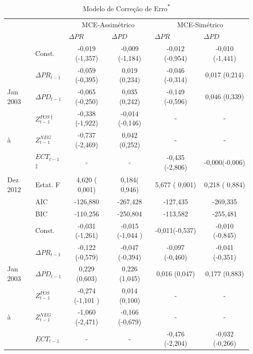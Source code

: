 \documentclass[
	article,			%
	12pt,				%
	openright,			%
	oneside,			%
	a4paper,			%
	english,			%
	brazil				%
	]{abntex2}
\begin{document}
\begin{table}[htbp]
  \centering
  \caption{Modelo de Correção de Erro\textsuperscript{$\ast$}}
    \begin{tabularx}{\textwidth}{X||l|c|c|c|c}
     \toprule
       		   &       & \multicolumn{2}{c}{MCE-Assimétrico} & \multicolumn{2}{c}{MCE-Simétrico} \\ 
       	     &  & \multicolumn{1}{l}{$\Delta PR$} & \multicolumn{1}{l}{$\Delta PD$} & \multicolumn{1}{l}{$\Delta PR$} & \multicolumn{1}{l}{$\Delta PD$} \\ \hline
    	 	  & Const.		 &  -0,019 (-1,357)  & -0,009 (-1,184)  & -0,012 (-0,954)	& -0,010 (-1,441) \\
         	 & $\Delta PR_{t-1}$   &-0,059 (-0,395)   & 0,019 (0,234)      &  -0,046 (-0,314)     & 0,017 (0,214) \\
Jan 2003   & $\Delta PD_{t-1}$    & -0,065 (-0,250)   & 0,035 (0,242)     &  -0,149 (-0,596)     & 0,046 (0,339)  \\
      	 & $Z^{POS}_{t-1}$\textsuperscript{$\dagger$}   &  -0,338 (-1,922)  &  -0,014 (-0,146) & 		-	     	&  -    		  \\
	à	& $Z^{NEG}_{t-1}$    &  -0,737 (-2,469)  &  0,042 (0,252)   &       	-		&  -	    		\\
         	& $ECT_{t-1}$\textsuperscript{$\ddagger$}   	& 		-	    & 		-		&   -0,435 (-2,806)	& -0,000(-0,006)  \\
Dez 2012	  & Estat. F 		& 4,620 ( 0,001)    &  0,184( 0,946)  &  5,677 ( 0,001)	& 0,218 ( 0,884) \\
         	 & AIC   			& -126,880	    & -267,428	       &  -127,435			&  -269,335  \\
          	& BIC  			& -110,256	    & -250,804	       & 	-113,582	        &  -255,481  \\ \hline
           	  & Const. 			& -0,031 (-1,261)	    & -0,015 (-1,044 )	 & 	-0,011(-0,537)	& -0,010	 (-0,845) \\
          	& $\Delta PR_{t-1}$ & -0,122 (-0,579)      & -0,047 (-0,394)     &  -0,097 (-0,460)    &  -0,041 (-0,351) \\
Jan 2003 	& $\Delta PD_{t-1}$ & 0,229 (0,603)    & 0,226 (1,045)       & 0,016 (0,047)      & 0,177 (0,883)  \\
      		& $Z^{POS}_{t-1}$ &  -0,274 (-1,101 )    & 0,014 (0,100)     &   -    &  - \\
	à	  & $Z^{NEG}_{t-1}$ &  -1,060 (-2,471)     & -0,166 (-0,679) &    -   &  - \\
         	& $ECT_{t-1}$   	& 	-		  & 		-		&       -0,476 (-2,204)	&  -0,032 (-0,266) \\

\end{tabularx}
\end{table}
\end{document}
